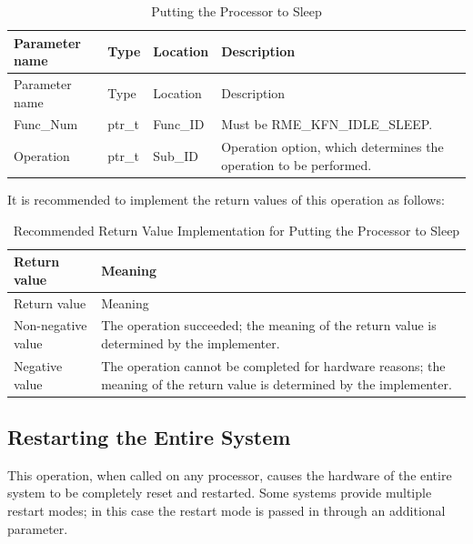 \begin{xltabular}{\textwidth}{@{}>{\hsize\raggedright\arraybackslash}X>{\hsize\raggedright\arraybackslash}X>{\hsize\raggedright\arraybackslash}X>{\hsize\raggedright\arraybackslash}X@{}}
\caption{Putting the Processor to Sleep}\label{tab:8-43-put-processor-to-sleep}\\
\toprule
Parameter name & Type & Location & Description\tabularnewline
\endfirsthead
\toprule
Parameter name & Type & Location & Description\tabularnewline
\midrule
\endhead
\bottomrule
\endlastfoot
Func\_Num & ptr\_t & Func\_ID &
Must be RME\_KFN\_IDLE\_SLEEP.\tabularnewline
Operation & ptr\_t & Sub\_ID &
Operation option, which determines the operation to be performed.\tabularnewline
\end{xltabular}
\nopagebreak[4]

It is recommended to implement the return values of this operation as follows:

\begin{xltabular}{\textwidth}{@{}>{\hsize\raggedright\arraybackslash}X>{\hsize\raggedright\arraybackslash}X@{}}
\caption{Recommended Return Value Implementation for Putting the Processor to Sleep}\label{tab:8-44-put-processor-to-sleep-suggested-return-values}\\
\toprule
Return value & Meaning\tabularnewline
\endfirsthead
\toprule
Return value & Meaning\tabularnewline
\midrule
\endhead
\bottomrule
\endlastfoot
    Non-negative value & The operation succeeded; the meaning of the return value is determined by the implementer.\tabularnewline
    Negative value & The operation cannot be completed for hardware reasons; the meaning of the return value is determined by the implementer.\tabularnewline
\end{xltabular}
\nopagebreak[4]

\subsection{Restarting the Entire System}\label{subsec:8-reboot-system}

This operation, when called on any processor, causes the hardware of the entire system to be completely reset and restarted. Some systems provide multiple restart modes; in this case the restart mode is passed in through an additional parameter.

